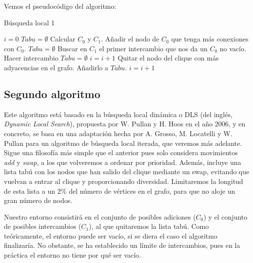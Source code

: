 Vemos el pseudocódigo del algoritmo:

\begin{algorithm}[H]
\caption{Búsqueda local 1}
  \begin{algorithmic}
    \State $i = 0$
    \State $Tabu = \emptyset$
    \State Calcular $C_0$ y $C_1$.
    \Repeat
        \State Añadir el nodo de $C_0$ que tenga más conexiones con $C_0$.
        \State $Tabu = \emptyset$
      \Else
        \State Buscar en $C_1$ el primer intercambio que nos da un $C_0$ no vacío.
          \State Hacer intercambio
          \State $Tabu = \emptyset$
          \State $i = i + 1$
        \Else
          \State Quitar el nodo del clique con más adyacencias en el grafo.
          \State Añadirlo a $Tabu$.
          \State $i = i + 1$
        \EndIf
      \EndIf
  \end{algorithmic}
\end{algorithm}

\subsection{Segundo algoritmo}

Este algoritmo está basado en la búsqueda local dinámica o DLS (del inglés, \textit{Dynamic Local Search}),
propuesta por W. Pullan y H. Hoos en el año 2006, y en concreto, se basa en una adaptación hecha
por A. Grosso, M. Locatelli y W. Pullan para un algoritmo de búsqueda local iterada, que veremos
más adelante. Sigue una filosofía más simple que el anterior pues solo considera movimientos
\textit{add} y \textit{swap}, a los que volveremos a ordenar por prioridad. Además, incluye una
lista tabú con los nodos que han salido del clique mediante un swap, evitando que vuelvan a entrar
al clique y proporcionando diversidad. Limitaremos la longitud de esta lista a un 2\% del número
de vértices en el grafo, para que no aloje un gran número de nodos.

Nuestro entorno consistirá en el conjunto de posibles adiciones ($C_0$) y el conjunto de
posibles intercambios ($C_1$), al que quitaremos la lista tabú. Como teóricamente, el entorno
puede ser vacío, si se diera el caso el algoritmo finalizaría. No obstante, se ha establecido un
límite de intercambios, pues en la práctica el entorno no tiene por qué ser vacío.

